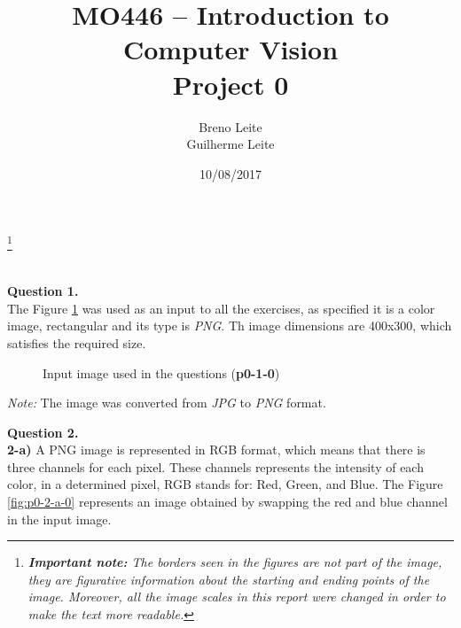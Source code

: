 \documentclass[12pt,a4paper]{article}
\title{MO446 -- Introduction to Computer Vision  \\ Project 0}
\author{Breno Leite  \\ Guilherme Leite}
\date{10/08/2017}
\newcommand\blfootnote[1]{%
	\begingroup
	\renewcommand\thefootnote{}\footnote{#1}%
	\addtocounter{footnote}{-1}%
	\endgroup
}
\begin{document}
\maketitle
\blfootnote{\textit{\textbf{Important note:} The borders seen in the figures are not part of the image, they are figurative information about the starting and ending points of the image. Moreover, all the image scales in this report were changed in order to make the text more readable.}} \\


\textbf{Question 1.} \\

The Figure \ref{fig:p0-1-0} was used as an input to all the exercises, as specified it is a color image, rectangular and its type is \emph{PNG}. Th image dimensions are 400x300, which satisfies the required size. \\

\begin{figure}[!h]
	\centering
	{%
		\setlength{\fboxsep}{1pt}%
		\setlength{\fboxrule}{1pt}%
	}%
	\caption{Input image used in the questions (\textbf{p0-1-0})}
	\label{fig:p0-1-0}
\end{figure}

\textit{Note:} The image was converted from \emph{JPG} to \emph{PNG} format. 

\newpage


\textbf{Question 2.} \\

\textbf{2-a) } A PNG image is represented in RGB format, which means that there is three channels for each pixel. These channels represents the intensity of each color, in a determined pixel, RGB stands for: Red, Green, and Blue. The Figure \ref{fig:p0-2-a-0} represents an image obtained by swapping the red and blue channel in the input image.
\end{document}
